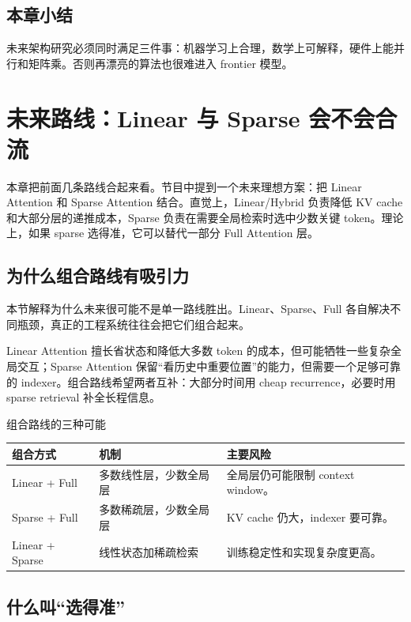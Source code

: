 \documentclass[a4paper]{article}
\begin{document}
\subsection{本章小结}

未来架构研究必须同时满足三件事：机器学习上合理，数学上可解释，硬件上能并行和矩阵乘。否则再漂亮的算法也很难进入 frontier 模型。

\section{未来路线：Linear 与 Sparse 会不会合流}

本章把前面几条路线合起来看。节目中提到一个未来理想方案：把 Linear Attention 和 Sparse Attention 结合。直觉上，Linear/Hybrid 负责降低 KV cache 和大部分层的递推成本，Sparse 负责在需要全局检索时选中少数关键 token。理论上，如果 sparse 选得准，它可以替代一部分 Full Attention 层。

\subsection{为什么组合路线有吸引力}

本节解释为什么未来很可能不是单一路线胜出。Linear、Sparse、Full 各自解决不同瓶颈，真正的工程系统往往会把它们组合起来。

Linear Attention 擅长省状态和降低大多数 token 的成本，但可能牺牲一些复杂全局交互；Sparse Attention 保留“看历史中重要位置”的能力，但需要一个足够可靠的 indexer。组合路线希望两者互补：大部分时间用 cheap recurrence，必要时用 sparse retrieval 补全长程信息。

\begin{knowledgebox}{组合路线的三种可能}
\begin{tabularx}{\textwidth}{p{}p{}X}
\toprule
组合方式 & 机制 & 主要风险 \\
\midrule
Linear + Full & 多数线性层，少数全局层 & 全局层仍可能限制 context window。 \\
Sparse + Full & 多数稀疏层，少数全局层 & KV cache 仍大，indexer 要可靠。 \\
Linear + Sparse & 线性状态加稀疏检索 & 训练稳定性和实现复杂度更高。 \\
\bottomrule
\end{tabularx}
\end{knowledgebox}

\subsection{什么叫“选得准”}
\end{document}
